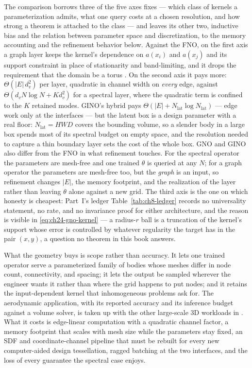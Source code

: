 The comparison borrows three of the five axes
 fixes --- which class of kernels a
parameterization admits, what one query costs at a chosen resolution, and how strong a theorem
is attached to the class --- and leaves its other two, inductive bias and the relation between
parameter space and discretization, to the memory accounting and the refinement behavior below.
Against the FNO, on the first axis a graph layer keeps the kernel's
dependence on $a(x_i)$ and $a(x_j)$ and its support constraint in place of stationarity and
band-limiting, and it drops the requirement that the domain be a torus
\cite{kovachki2023neural,li2021fourier}. On the second axis it pays more: $\Theta(|E|\,
d_v^{2})$ per layer, quadratic in channel width on \emph{every} edge, against $\Theta(d_v N
\log N + K d_v^{2})$ for a spectral layer, where the quadratic term is confined to the $K$
retained modes. GINO's hybrid pays $\Theta(|E| + N_{\text{lat}} \log N_{\text{lat}})$ --- edge
work only at the interfaces --- but the latent box is a design parameter with a real floor:
$N_{\text{lat}} = HWD$ covers the bounding volume, so a slender body in a large box spends
most of its spectral budget on empty space, and the resolution needed to capture a thin
boundary layer sets the cost of the whole box. GNO and GINO
also differ from the FNO in what refinement touches. For the spectral operator the parameters
are mesh-free and one trained $\theta$ is queried at any $N$; for a graph operator the
parameters are mesh-free too, but the \emph{graph} is an input, so refinement changes $|E|$,
the memory footprint, and the realization of the layer rather than leaving $\theta$ alone
against a new grid. The third axis is the one on which honesty is cheapest: Part~I's ledger
Table~\ref{tab:ch8-ledger} records no universality statement, no rate, and no invariance proof
for either architecture, and the reason is visible in \eqref{eq:ch24-gno-kernel} --- a
radius-$r$ ball is a truncation of the kernel's support whose error is controlled by whatever
regularity the target has in the pair $(x,y)$, a question no theorem in this book answers.

What the geometry buys is scope rather than accuracy. It lets one trained operator serve a
parameterized family of bodies whose meshes differ in node count, connectivity, and spacing; it
lets the output be sampled wherever the engineer wants it rather than where the grid happens
to put nodes; and it retains the input-dependent kernel that inhomogeneous problems ask for.
The aerodynamic application, with its reported accuracy and its inference budget against a
volume solver, is taken up with the other large-scale 3D workloads in
. What it costs is edge-linear
computation with a quadratic channel factor, a memory footprint that scales with mesh size while
the parameters stay fixed, an SDF and coordinate-channel pipeline that must be rebuilt for
every new computer-aided design tessellation, ragged batching at the two
interfaces, and the loss of every guarantee the spectral case enjoys.

